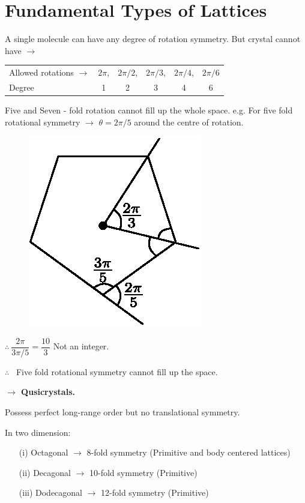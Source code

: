 \section*{Fundamental Types of Lattices}

A single molecule can have any degree of rotation symmetry. But crystal cannot have $\to$
\begin{center}
\begin{tabular}{lccccc}
Allowed rotations $\to$ & $2\pi$, & $2\pi/2$, & $2\pi/3$, & $2\pi/4$, & $2\pi/6$\\[3pt]
Degree & 1 & 2 & 3 & 4 & 6
\end{tabular}
\end{center}

Five and Seven - fold rotation cannot fill up the whole space. e.g. For five fold rotational symmetry $\to$ $\theta=2\pi/5$ around the centre of rotation.
\begin{figure}[H]
\centering
\includegraphics{images/lecture2/fig3.eps}
\end{figure}

$\therefore \ \dfrac{2\pi}{3\pi/5}=\dfrac{10}{3}$ Not an integer.

\smallskip

$\therefore$ \ Five fold rotational symmetry cannot fill up the space.

\smallskip

{\bf $\to$ Qusicrystals.}

\smallskip

Possess perfect long-range order but no translational symmetry.

In two dimension:
\begin{itemize}
\item[(i)] Octagonal $\to$ 8-fold symmetry (Primitive and body centered lattices)

\item[(ii)] Decagonal $\to$ 10-fold symmetry (Primitive)

\item[(iii)] Dodecagonal $\to$ 12-fold symmetry (Primitive)
\end{itemize}

